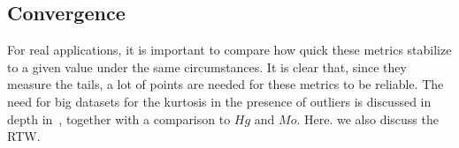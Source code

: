 	
	\subsection{Convergence}
	\label{sec:EWS_convergence}
	For real applications, it is important to compare how quick these metrics stabilize to a given value under the same circumstances. 
	It is clear that, since they measure the tails, a lot of points are needed for these metrics to be reliable. 
	The need for big datasets for the kurtosis in the presence of outliers is  discussed in depth in~\cite{KIM200456}, together with a comparison to $Hg$ and  $Mo$. Here. we  also discuss the  RTW. 
	
